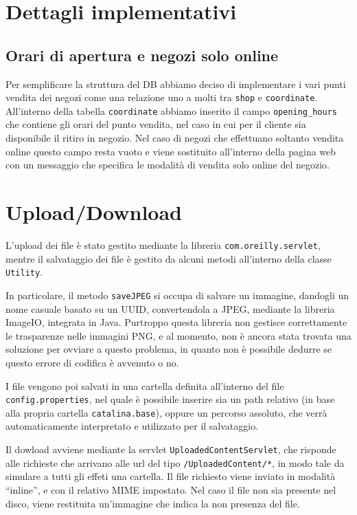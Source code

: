\chapter{Dettagli implementativi}

\section{Orari di apertura e negozi solo online}
Per semplificare la struttura del DB abbiamo deciso di implementare i vari punti vendita dei negozi come una relazione uno a molti tra \texttt{shop} e \texttt{coordinate}. All'interno della tabella \texttt{coordinate} abbiamo inserito il campo \texttt{opening\_hours} che contiene gli orari del punto vendita, nel caso in cui per il cliente sia disponibile il ritiro in negozio. Nel caso di negozi che effettuano soltanto vendita online questo campo resta vuoto e viene sostituito all'interno della pagina web con un messaggio che specifica le modalità di vendita solo online del negozio.

\chapter{Upload/Download}

L'upload dei file è stato gestito mediante la libreria \texttt{com.oreilly.servlet}, mentre il salvataggio dei file è gestito da alcuni metodi all'interno della classe \texttt{Utility}.

In particolare, il metodo \texttt{saveJPEG} si occupa di salvare un immagine, dandogli un nome casuale basato su un UUID, convertendola a JPEG, mediante la libreria ImageIO, integrata in Java.
Purtroppo questa libreria non gestisce correttamente le trasparenze nelle immagini PNG, e al momento, non è ancora stata trovata una soluzione per ovviare a questo problema, in quanto non è possibile dedurre se questo errore di codifica è avvenuto o no.

I file vengono poi salvati in una cartella definita all'interno del file \texttt{config.properties}, nel quale è possibile inserire sia un path relativo (in base alla propria cartella \texttt{catalina.base}), oppure un percorso assoluto, che verrà automaticamente interpretato e utilizzato per il salvataggio.

Il dowload avviene mediante la servlet \texttt{UploadedContentServlet}, che risponde alle richieste che arrivano alle url del tipo \texttt{/UploadedContent/*}, in modo tale da simulare a tutti gli effeti una cartella. Il file richiesto viene inviato in modalità ``inline'', e con il relativo MIME impostato. Nel caso il file non sia presente nel disco, viene restituita un'immagine che indica la non presenza del file.

